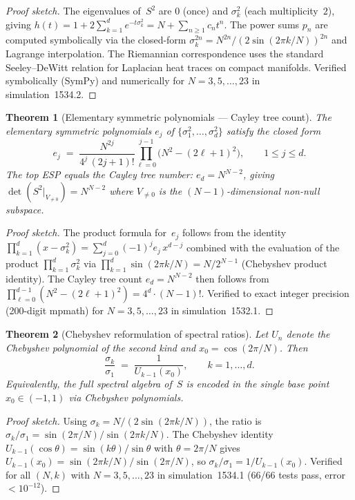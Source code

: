 \documentclass[aps,prd,twocolumn,superscriptaddress,floatfix,nofootinbib]{revtex4-2}
\newtheorem{theorem}{Theorem}
\theoremstyle{definition}
\theoremstyle{remark}
\begin{document}
\begin{proof}[Proof sketch]
The eigenvalues of~$S^2$ are $0$ (once) and $\sigma_k^2$
(each multiplicity~$2$), giving
$h(t) = 1 + 2\sum_{k=1}^{d}e^{-t\sigma_k^2} = N + \sum_{n\ge 1}c_n t^n$.
The power sums $p_n$ are computed symbolically via the
closed-form $\sigma_k^{2n} = N^{2n}/(2\sin(2\pi k/N))^{2n}$
and Lagrange interpolation.
The Riemannian correspondence uses the standard Seeley--DeWitt
relation for Laplacian heat traces on compact manifolds.
Verified symbolically (SymPy) and numerically for
$N = 3,5,\ldots,23$ in simulation~1534.2.
\end{proof}

\begin{theorem}[Elementary symmetric polynomials --- Cayley tree count]%
  \label{thm:ESP-cayley}
The elementary symmetric polynomials $e_j$ of
$\{\sigma_1^2,\ldots,\sigma_d^2\}$ satisfy the closed form
\[
  e_j \;=\; \frac{N^{2j}}{4^j\,(2j+1)!}
  \prod_{\ell=0}^{j-1}\!\bigl(N^2 - (2\ell+1)^2\bigr),
  \qquad 1 \le j \le d.
\]
The top ESP equals the Cayley tree number:
$e_d = N^{N-2}$,
giving $\det(S^2\big|_{V_{\ne 0}}) = N^{N-2}$ where
$V_{\ne 0}$ is the $(N-1)$-dimensional non-null subspace.
\end{theorem}

\begin{proof}[Proof sketch]
The product formula for~$e_j$ follows from the identity
$\prod_{k=1}^{d}(x - \sigma_k^2)
= \sum_{j=0}^{d}(-1)^j e_j\,x^{d-j}$
combined with the evaluation of the product
$\prod_{k=1}^{d}\sigma_k^2$ via $\prod_{k=1}^{d}\sin(2\pi k/N)
= N/2^{N-1}$ (Chebyshev product identity).
The Cayley tree count $e_d = N^{N-2}$ then follows from
$\prod_{\ell=0}^{d-1}(N^2 - (2\ell+1)^2) = 4^d\cdot(N-1)!$.
Verified to exact integer precision (200-digit mpmath) for
$N = 3,5,\ldots,23$ in simulation~1532.1.
\end{proof}

\begin{theorem}[Chebyshev reformulation of spectral ratios]%
  \label{thm:chebyshev-ratios}
Let $U_n$ denote the Chebyshev polynomial of the second kind
and $x_0 = \cos(2\pi/N)$.  Then
\[
  \frac{\sigma_k}{\sigma_1}
  \;=\; \frac{1}{U_{k-1}(x_0)},
  \qquad k = 1,\ldots,d.
\]
Equivalently, the full spectral algebra of~$S$ is encoded in the
single base point $x_0 \in (-1,1)$ via Chebyshev polynomials.
\end{theorem}

\begin{proof}[Proof sketch]
Using $\sigma_k = N/(2\sin(2\pi k/N))$, the ratio is
$\sigma_k/\sigma_1 = \sin(2\pi/N)/\sin(2\pi k/N)$.
The Chebyshev identity $U_{k-1}(\cos\theta)
= \sin(k\theta)/\sin\theta$ with $\theta = 2\pi/N$ gives
$U_{k-1}(x_0) = \sin(2\pi k/N)/\sin(2\pi/N)$,
so $\sigma_k/\sigma_1 = 1/U_{k-1}(x_0)$.
Verified for all $(N,k)$ with $N = 3,5,\ldots,23$ in
simulation~1534.1 (66/66 tests pass, error $<10^{-12}$).
\end{proof}
\end{document}
